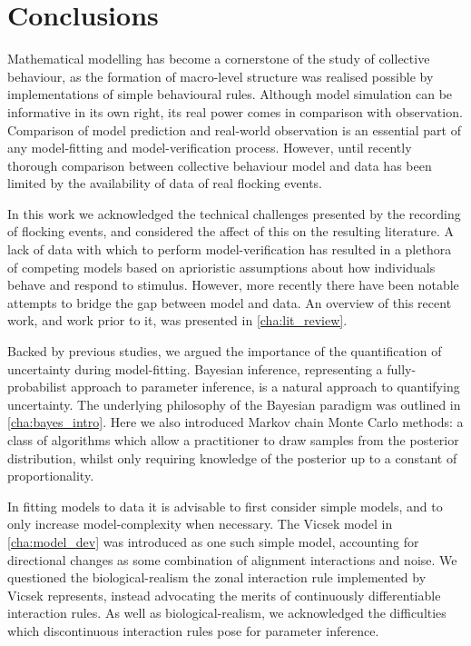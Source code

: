 \chapter*{Conclusions}
\label{cha:conc}

Mathematical modelling has become a cornerstone of the study of collective
behaviour, as the formation of macro-level structure was realised possible by
implementations of simple behavioural rules. Although model simulation can be
informative in its own right, its real power comes in comparison with
observation. Comparison of model prediction and real-world observation is an
essential part of any model-fitting and model-verification process. However,
until recently thorough comparison between collective behaviour model and data
has been limited by the availability of data of real flocking events.

In this work we acknowledged the technical challenges presented by the
recording of flocking events, and considered the affect of this on the
resulting literature. A lack of data with which to perform model-verification
has resulted in a plethora of competing models based on aprioristic assumptions
about how individuals behave and respond to stimulus. However, more recently
there have been notable attempts to bridge the gap between model and data. An
overview of this recent work, and work prior to it, was presented in
\cref{cha:lit_review}.

Backed by previous studies, we argued the importance of the quantification of
uncertainty during model-fitting. Bayesian inference, representing a
fully-probabilist approach to parameter inference, is a natural approach to
quantifying uncertainty. The underlying philosophy of the Bayesian paradigm was
outlined in \cref{cha:bayes_intro}. Here we also introduced Markov chain Monte
Carlo methods: a class of algorithms which allow a practitioner to draw samples
from the posterior distribution, whilst only requiring knowledge of the
posterior up to a constant of proportionality.

In fitting models to data it is advisable to first consider simple models, and
to only increase model-complexity when necessary. The Vicsek model in
\cref{cha:model_dev} was introduced as one such simple model, accounting for
directional changes as some combination of alignment interactions and noise. We
questioned the biological-realism the zonal interaction rule implemented by
Vicsek represents, instead advocating the merits of continuously differentiable
interaction rules. As well as biological-realism, we acknowledged the
difficulties which discontinuous interaction rules pose for parameter
inference.


